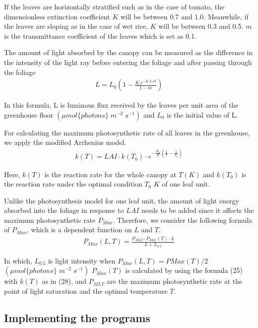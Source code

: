 \documentclass[a4paper]{article}
\begin{document}
If the leaves are horizontally stratified such as in the case of tomato, the dimensionless extinction coefficient \(K\) will be between 0.7 and 1.0. Meanwhile, if the leaves are sloping as in the case of wet rice, \(K\) will be between 0.3 and 0.5. \(m\) is the transmittance coefficient of the leaves which is set as 0.1.

The amount of light absorbed by the canopy can be measured as the difference in the intensity of the light ray before entering the foliage and after passing through the foliage
\begin{gather}
  L =L_0(1 - \frac{K.e^{-K.LAI}}{1 - m})
\end{gather}

In this formula, L is luminous flux received by the leaves per unit area of the greenhouse floor \((\mu mol\{photons\}\;m^{-2}\;s^{-1})\) and \(L_0\) is the initial value of L.

For calculating the maximum photosynthetic rate of all leaves in the greenhouse, we apply the modified Arrhenius model.
\begin{gather}
  k(T) = LAI \cdot k(T_0) \cdot e^{-\frac{H_a}{R}(\frac{1}{T} - \frac{1}{T_0})}
\end{gather}

Here, \(k(T)\) is the reaction rate for the whole canopy at \(T (K)\) and \(k(T_0)\) is the reaction rate under the optimal condition \(T_0\) \(K\) of one leaf unit.

Unlike the photosynthesis model for one leaf unit, the amount of light energy absorbed into the foliage in response to \(LAI\) needs to be added since it affects the maximum photosynthetic rate \(P_{Max}\). Therefore, we consider the following formula of \(P_{Max}\), which is a dependent function on \(L\) and \(T\).
\begin{gather}
  P_{Max} (L,T) = \frac{P_{MLT} \cdot P_{Max}(T) \cdot L}{L + L_{0.5}}
\end{gather}

In which, \(L_{0.5}\) is light intensity when \(P_{Max} (L,T) = PMax(T)/2\) \((\mu mol\{photons\}\;m^{-2}\;s^{-1})\)
\(P_{Max}(T)\) is calculated by using the formula (25) with \(k(T)\) as in (28), and \(P_{MLT}\) are the maximum
photosynthetic rate at the point of light saturation and the optimal temperature \(T\).


\subsection{Implementing the programs}
\end{document}

